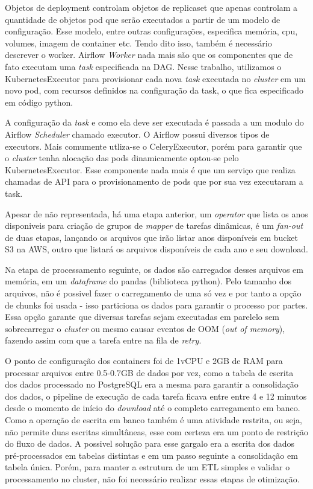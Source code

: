Objetos de deployment controlam objetos de replicaset que apenas controlam a quantidade de objetos pod que serão executados a partir de um modelo de configuração. Esse modelo, entre outras configurações, especifica memória, cpu, volumes, imagem de container etc. Tendo dito isso, também é necessário descrever o worker. Airflow \emph{Worker} nada mais são que os componentes que de fato executam uma \emph{task} especificada na DAG. Nesse trabalho, utilizamos o KubernetesExecutor para provisionar cada nova \emph{task} executada no \emph{cluster} em um novo pod, com recursos definidos na configuração da task, o que fica especificado em código python. 

A configuração da \emph{task} e como ela deve ser executada é passada a um modulo do Airflow \emph{Scheduler} chamado executor. O Airflow possui diversos tipos de executors. Mais comumente utliza-se o CeleryExecutor, porém para garantir que o \emph{cluster} tenha alocação das pods dinamicamente optou-se pelo KubernetesExecutor. Esse componente nada mais é que um serviço que realiza chamadas de API para o provisionamento de pods que por sua vez executaram a task.


Apesar de não representada, há uma etapa anterior, um \emph{operator} que lista os anos disponiveis para criação de grupos de \emph{mapper} de tarefas dinâmicas, é um \emph{fan-out} de duas etapas, lançando os arquivos que irão listar anos disponíveis em bucket S3 na AWS, outro que listará os arquivos disponíveis de cada ano e seu download.

Na etapa de processamento seguinte, os dados são carregados desses arquivos em memória, em um \emph{dataframe} do {pandas} (biblioteca python). Pelo tamanho dos arquivos, não é possivel fazer o carregamento de uma só vez e por tanto a opção de chunks foi usada - isso particiona os dados para garantir o processo por partes. Essa opção garante que diversas tarefas sejam executadas em parelelo sem sobrecarregar o \emph{cluster} ou mesmo causar eventos de OOM (\emph{out of memory}), fazendo assim com que a tarefa entre na fila de \emph{retry}.

O ponto de configuração dos containers foi de 1vCPU e 2GB de RAM para processar arquivos entre 0.5-0.7GB de dados por vez, como a tabela de escrita dos dados processado no PostgreSQL era a mesma para garantir a consolidação dos dados, o pipeline de execução de cada tarefa ficava entre entre 4 e 12 minutos desde o momento de início do \emph{download} até o completo carregamento em banco. Como a operação de escrita em banco também é uma atividade restrita, ou seja, não permite duas escritas simultâneas, esse com certeza era um ponto de restrição do fluxo de dados. A possivel solução para esse gargalo era a escrita dos dados pré-processados em tabelas distintas e em um passo seguinte a consolidação em tabela única. Porém, para manter a estrutura de um ETL simples e validar o processamento no cluster, não foi necessário realizar essas etapas de otimização. 

